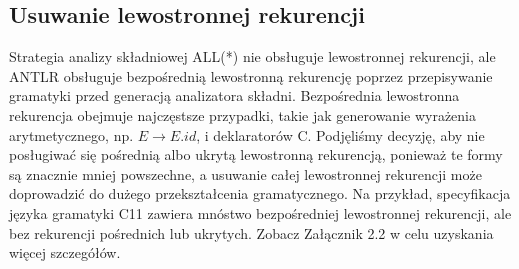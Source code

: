 \subsection{Usuwanie lewostronnej rekurencji}
Strategia analizy składniowej ALL(*) nie obsługuje lewostronnej rekurencji,
ale ANTLR obsługuje bezpośrednią lewostronną rekurencję poprzez przepisywanie
gramatyki przed generacją analizatora składni.
Bezpośrednia lewostronna rekurencja obejmuje najczęstsze przypadki,
takie jak generowanie wyrażenia arytmetycznego,
np. $E \rightarrow E.id$, i deklaratorów C.
Podjęliśmy decyzję, aby nie posługiwać się pośrednią albo ukrytą lewostronną
rekurencją, ponieważ te formy są znacznie mniej powszechne,
a usuwanie całej lewostronnej rekurencji może doprowadzić do dużego
przekształcenia gramatycznego.
Na przykład, specyfikacja języka gramatyki C11 zawiera mnóstwo bezpośredniej
lewostronnej rekurencji, ale bez rekurencji pośrednich lub ukrytych.
Zobacz Załącznik 2.2 w celu uzyskania więcej szczegółów.
